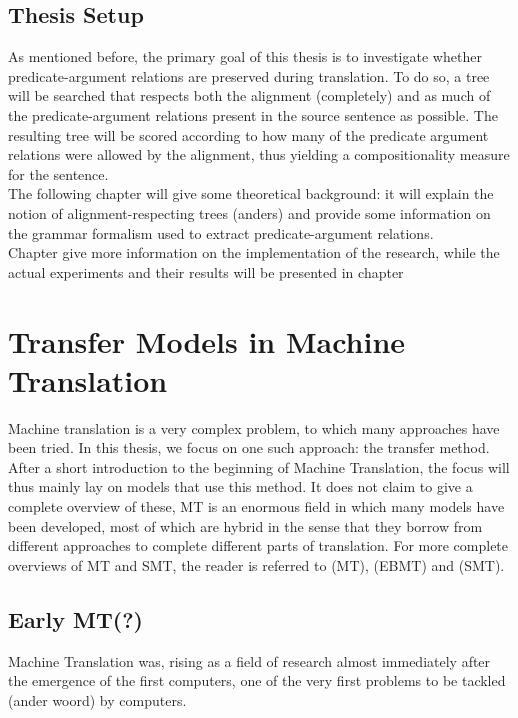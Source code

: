\documentclass{report}
\theoremstyle{indented}
\begin{document}
\section*{Thesis Setup}

As mentioned before, the primary goal of this thesis is to investigate whether predicate-argument relations are preserved during translation. To do so, a tree will be searched that respects both the alignment (completely) and as much of the predicate-argument relations present in the source sentence as possible. The resulting tree will be scored according to how many of the predicate argument relations were allowed by the alignment, thus yielding a compositionality measure for the sentence.\\
The following chapter will give some theoretical background: it will explain the notion of alignment-respecting trees (anders) and provide some information on the grammar formalism used to extract predicate-argument relations.\\
Chapter give more information on the implementation of the research, while the actual experiments and their results will be presented in chapter 


\chapter{Transfer Models in Machine Translation}

Machine translation is a very complex problem, to which many approaches have been tried. In this thesis, we focus on one such approach: the transfer method.   After a short introduction to the beginning of Machine Translation, the focus will thus mainly lay on models that use this method. It does not claim to give a complete overview of these, MT is an enormous field in which many models have been developed, most of which are hybrid in the sense that they borrow from different approaches to complete different parts of translation. For more complete overviews of MT and SMT, the reader is referred to \cite{hutchins1992introduction} (MT), \cite{somers1999review} (EBMT) and \cite{koehn2008statistical} (SMT).


\section{Early MT(?)}
Machine Translation was, rising as a field of research almost immediately after the emergence of the first computers, one of the very first problems to be tackled (ander woord) by computers.
\end{document}
